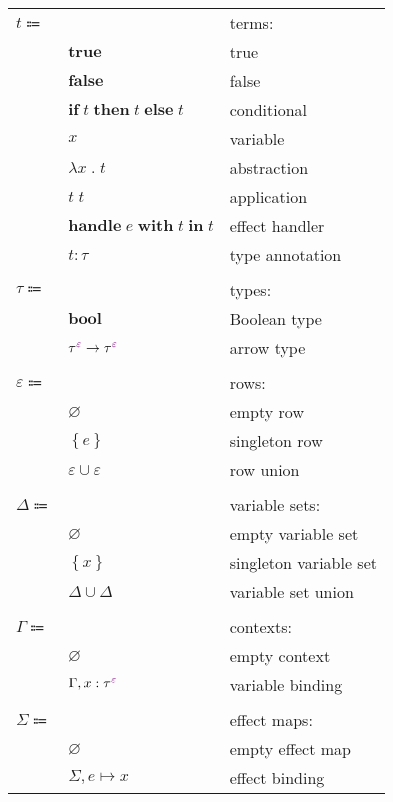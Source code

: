 \documentclass[12pt]{article}
\newcommand\anno[2]{#1 : #2}
\newcommand\term{t}
\newcommand\eTrue{\textbf{true}}
\newcommand\eFalse{\textbf{false}}
\newcommand\eIf[3]{\textbf{if} \; #1 \; \textbf{then} \; #2 \; \textbf{else} \; #3}
\newcommand\eVar{x}
\newcommand\eAbs[2]{\lambda #1 \; . \; #2}
\newcommand\eApp[2]{#1 \; #2}
\newcommand\eHandle[3]{\textbf{handle} \; #1 \; \textbf{with} \; #2 \; \textbf{in} \; #3}
\newcommand\eAnno[2]{\anno{#1}{#2}}
\newcommand\type{\tau}
\newcommand\tBool{\textbf{bool}}
\newcommand\tArrow[4]{\tEmbellished{#1}{#2} \rightarrow \tEmbellished{#3}{#4}}
\newcommand\tEmbellished[2]{{#1}^{\textcolor{violet}{#2}}}
\newcommand\row{\varepsilon}
\newcommand\rEmpty{\varnothing}
\newcommand\rSingleton[1]{\left\{ #1 \right\}}
\newcommand\rUnion[2]{#1 \cup #2}
\newcommand\varSet{\Delta}
\newcommand\vsSingleton[1]{\left\{ #1 \right\}}
\newcommand\vsEmpty{\varnothing}
\newcommand\vsUnion[2]{#1 \cup #2}
\newcommand\context{\Gamma}
\newcommand\cEmpty{\varnothing}
\newcommand\cExtend[4]{#1, \anno{#2}{\tEmbellished{#3}{#4}}}
\newcommand\effect{e}
\newcommand\effectMap{\Sigma}
\newcommand\emMap[2]{#1 \mapsto #2}
\newcommand\emEmpty{\varnothing}
\newcommand\emExtend[3]{#1, \emMap{#2}{#3}}
\begin{document}
      \begin{figure}[H]
        \begin{mdframed}[backgroundcolor=none]
          \begin{center}
            \begin{tabular}{l l l}
              $\term \Coloneqq$ & & terms: \\
              & $\eTrue$ & true \\
              & $\eFalse$ & false \\
              & $\eIf{\term}{\term}{\term}$ & conditional \\
              & $\eVar$ & variable \\
              & $\eAbs{\eVar}{\term}$ & abstraction \\
              & $\eApp{\term}{\term}$ & application \\
              & $\eHandle{\effect}{\term}{\term}$ & effect handler \\
              & $\eAnno{\term}{\type}$ & type annotation \\
              \\
              $\type \Coloneqq$ & & types: \\
              & $\tBool$ & Boolean type \\
              & $\tArrow{\type}{\row}{\type}{\row}$ & arrow type \\
              \\
              $\row \Coloneqq$ & & rows: \\
              & $\rEmpty$ & empty row \\
              & $\rSingleton{\effect}$ & singleton row \\
              & $\rUnion{\row}{\row}$ & row union \\
              \\
              $\varSet \Coloneqq$ & & variable sets: \\
              & $\vsEmpty$ & empty variable set \\
              & $\vsSingleton{\eVar}$ & singleton variable set \\
              & $\vsUnion{\varSet}{\varSet}$ & variable set union \\
              \\
              $\context \Coloneqq$ & & contexts: \\
              & $\cEmpty$ & empty context \\
              & $\cExtend{\context}{\eVar}{\type}{\row}$ & variable binding \\
              \\
              $\effectMap \Coloneqq$ & & effect maps: \\
              & $\emEmpty$ & empty effect map \\
              & $\emExtend{\effectMap}{\effect}{\eVar}$ & effect binding \\
            \end{tabular}
          \end{center}


\end{mdframed}
\end{figure}
\end{document}
